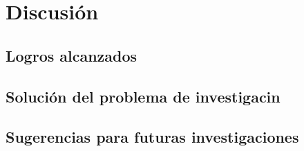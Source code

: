 \fancyhead{}
\fancyfoot{}
\cfoot{\thepage}


\chapter{Discusión}


\section{Logros alcanzados}
\section{Solución del problema de investigacin}
\section{Sugerencias para futuras investigaciones}
